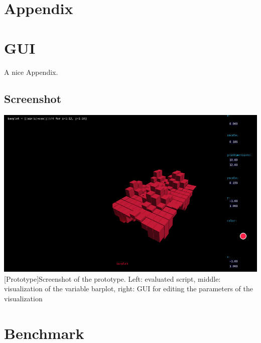 \setcounter{page}{1}

\begin{appendix}
\section*{Appendix}
{}

\section{GUI}
A nice Appendix.

\subsection*{Screenshot}
\begin{minipage}{\linewidth}
    \centering
    \includegraphics[scale=2.0]{graphics/screenshot.png}
    [Prototype]{Screenshot of the prototype. Left: evaluated script, middle: visualization of the variable barplot, right: GUI for editing the parameters of the visualization}
    \label{app:screenshot}
\end{minipage}


\section{Benchmark}


\end{appendix}
